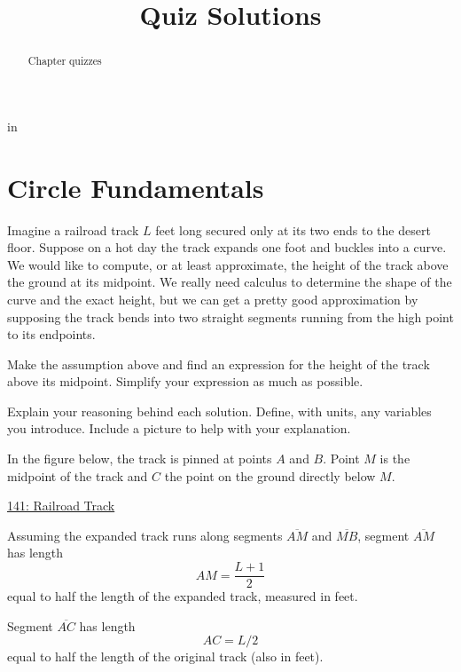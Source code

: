 \documentclass{ximera}
\title{Quiz Solutions}
\newcommand{\pskip}{\vskip 0.1 in}
\begin{document}
\begin{abstract}
Chapter quizzes
\end{abstract}
\maketitle


\pskip

\section*{Circle Fundamentals}


\begin{question}  \label{Q:9444433331350}
Imagine a railroad track $L$ feet long secured only at its two ends to the desert floor. Suppose on a hot day the track expands one foot and buckles into a curve. We would like to compute, or at least approximate, the height of the track above the ground at its midpoint. We really need calculus to determine the shape of the curve and the exact height, but we can get a pretty good approximation by supposing the track bends into two straight segments running from the high point to its endpoints.

Make the assumption above and find an expression for the height of the track above its midpoint. Simplify your expression as much as possible. 

Explain your reasoning behind each solution. Define, with units, any variables you introduce. Include a picture to help with your explanation.

\begin{explanation}
In the figure below, the track is pinned at points $A$ and $B$. Point $M$ is the midpoint of the track and $C$ the point on the ground directly below $M$.

\begin{onlineOnly}
    \begin{center}
\end{center}
\end{onlineOnly}

\href{https://www.desmos.com/calculator/uio1ixkbxe}{141: Railroad Track}


Assuming the expanded track runs along segments $\overline{AM}$ and $\overline{MB}$,  segment $\overline{AM}$ has length
\[
   AM = \frac{L+1}{2}
\]
equal to half the length of the expanded track, measured in feet.

Segment $\overline{AC}$ has length
\[
  AC = L/2
\]
equal to half the length of the original track (also in feet). 


\end{explanation}
\end{question}
\end{document}
